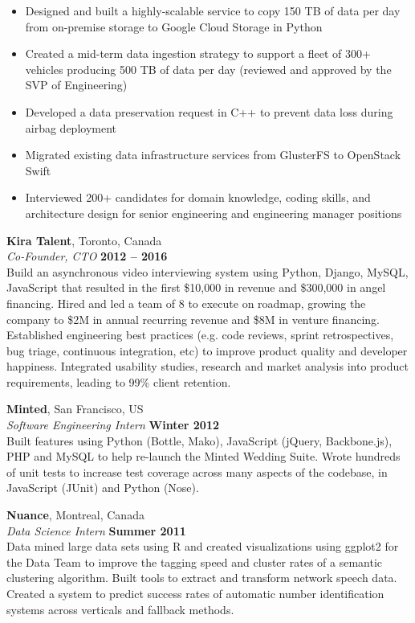 \documentclass[margin,line]{resume}
\begin{document}
\begin{resume}
    \begin{itemize}
    \item Designed and built a highly-scalable service to copy 150 TB of data per day from on-premise storage to Google Cloud Storage in Python
    \item Created a mid-term data ingestion strategy to support a fleet of 300+ vehicles producing 500 TB of data per day (reviewed and approved by the SVP of Engineering)
    \item Developed a data preservation request in C++ to prevent data loss during airbag deployment
    \item Migrated existing data infrastructure services from GlusterFS to OpenStack Swift
    \item Interviewed 200+ candidates for domain knowledge, coding skills, and architecture design for senior engineering and engineering manager positions
    \end{itemize}
    \vspace{-4mm}
    \textbf{Kira Talent}, Toronto, Canada \vspace{1mm}\\\vspace{1mm}%
    \textsl{Co-Founder, CTO} \hfill \textbf{2012 -- 2016}\\
    Build an asynchronous video interviewing system using Python, Django, MySQL, JavaScript that resulted in the first \$10,000 in revenue and \$300,000 in angel financing. Hired and led a team of 8 to execute on roadmap, growing the company to \$2M in annual recurring revenue and \$8M in venture financing. Established engineering best practices (e.g. code reviews, sprint retrospectives, bug triage, continuous integration, etc) to improve product quality and developer happiness. Integrated usability studies, research and market analysis into product requirements, leading to 99\% client retention.

    \textbf{Minted}, San Francisco, US \vspace{1mm}\\\vspace{1mm}%
    \textsl{Software Engineering Intern} \hfill \textbf{Winter 2012}\\
     Built features using Python (Bottle, Mako), JavaScript (jQuery, Backbone.js), PHP and MySQL to help re-launch the Minted Wedding Suite. Wrote hundreds of unit tests to increase test coverage across many aspects of the codebase, in JavaScript (JUnit) and Python (Nose).
     
    \textbf{Nuance}, Montreal, Canada \vspace{1mm}\\\vspace{1mm}%
    \textsl{Data Science Intern} \hfill \textbf{Summer 2011}\\
    Data mined large data sets using R and created visualizations using ggplot2 for the Data Team to improve the tagging speed and cluster rates of a semantic clustering algorithm. Built tools to extract and transform network speech data. Created a system to predict success rates of automatic number identification systems across verticals and fallback methods.


\end{resume}
\end{document}
